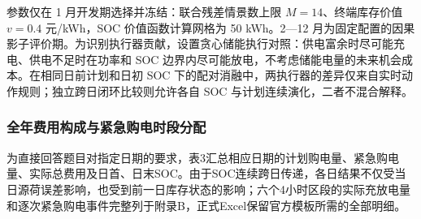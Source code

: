 \documentclass[zihao=-4,a4paper,UTF8,fontset=none]{ctexart}
\begin{document}
参数仅在 1 月开发期选择并冻结：联合残差情景数上限 \(M=14\)、终端库存价值 \(v=0.4\) 元/kWh，SOC 价值函数计算网格为 50 kWh。2---12 月为固定配置的因果影子评价期。为识别执行器贡献，设置贪心储能执行对照：供电富余时尽可能充电、供电不足时在功率和 SOC 边界内尽可能放电，不考虑储能电量的未来机会成本。在相同日前计划和日初 SOC 下的配对消融中，两执行器的差异仅来自实时动作规则；独立跨日闭环比较则允许各自 SOC 与计划连续演化，二者不混合解释。

\subsubsection{全年费用构成与紧急购电时段分配}\label{ux5168ux5e74ux8d39ux7528ux6784ux6210ux4e0eux7d27ux6025ux8d2dux7535ux65f6ux6bb5ux5206ux914d}

为直接回答题目对指定日期的要求，表3汇总相应日期的计划购电量、紧急购电量、实际总费用及日首、日末SOC。由于SOC连续跨日传递，各日结果不仅受当日源荷误差影响，也受到前一日库存状态的影响；六个4小时区段的实际充放电量和逐次紧急购电事件完整列于附录B，正式Excel保留官方模板所需的全部明细。
\end{document}
